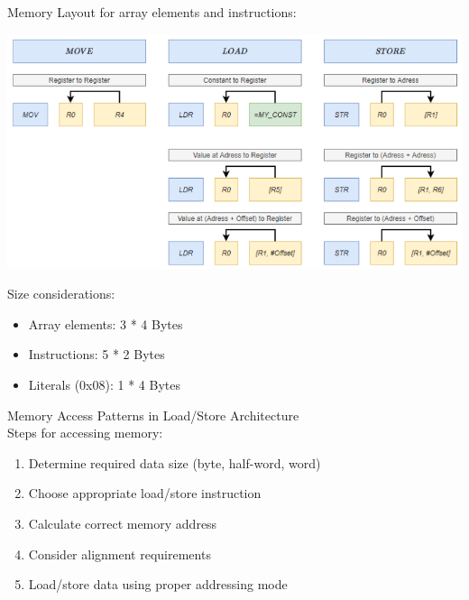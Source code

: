 \begin{corollary}{Memory Layout}
for array elements and instructions:

\includegraphics[width=\linewidth]{images/memory_layout.png}
\end{corollary}

\begin{remark}
Size considerations:
\begin{itemize}
  \item Array elements: 3 * 4 Bytes
  \item Instructions: 5 * 2 Bytes
  \item Literals (0x08): 1 * 4 Bytes
\end{itemize}
\end{remark}

\begin{KR}{Memory Access Patterns} in Load/Store Architecture \\
Steps for accessing memory:
\begin{enumerate}
  \item Determine required data size (byte, half-word, word)
  \item Choose appropriate load/store instruction
  \item Calculate correct memory address
  \item Consider alignment requirements
  \item Load/store data using proper addressing mode
\end{enumerate}
\end{KR}

